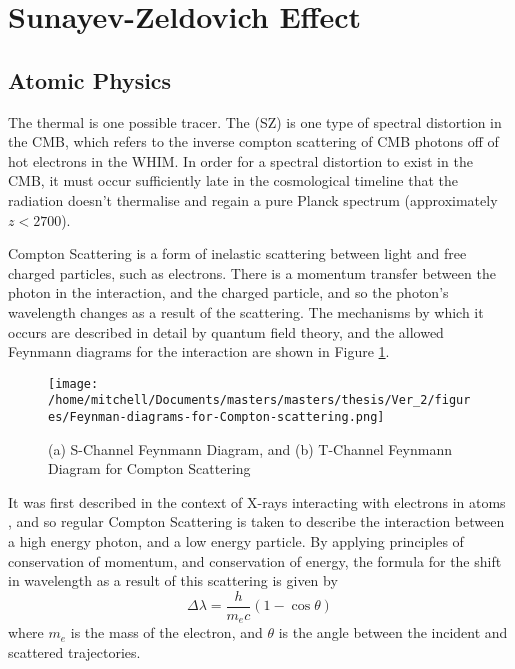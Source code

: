 \section{Sunayev-Zeldovich Effect}

\subsection{Atomic Physics}
The thermal \sze is one possible tracer. The \sze (SZ) is one type of spectral distortion in the CMB, which refers to the inverse compton scattering of CMB photons off of hot electrons in the WHIM. In order for a spectral distortion to exist in the CMB, it must occur sufficiently late in the cosmological timeline that the radiation doesn't thermalise and regain a pure Planck spectrum (approximately $z < 2700$).

Compton Scattering is a form of inelastic scattering between light and free charged particles, such as electrons. There is a momentum transfer between the photon in the interaction, and the charged particle, and so the photon's wavelength changes as a result of the scattering. The mechanisms by which it occurs are described in detail by quantum field theory, and the allowed Feynmann diagrams for the interaction are shown in Figure \ref{fig:compton_scattering}.

\begin{figure}[h!]
\centering
\texttt{[image: /home/mitchell/Documents/masters/masters/thesis/Ver\_2/figures/Feynman-diagrams-for-Compton-scattering.png]}
\label{fig:compton_scattering}
\caption{(a) S-Channel Feynmann Diagram, and (b) T-Channel Feynmann Diagram for Compton Scattering }
\label{fig:compton_scattering}
\end{figure}


It was first described in the context of X-rays interacting with electrons in atoms \citep{1923PhRv...21..483C}, and so regular Compton Scattering is taken to describe the interaction between a high energy photon, and a low energy particle. By applying principles of conservation of momentum, and conservation of energy,  the formula for the shift in wavelength as a result of this scattering is given by
\begin{equation}
	\Delta \lambda = \frac{h}{m_ec}\left(1-\cos\theta\right)
	\label{eqn:compton_shift}
\end{equation}
where $m_e$ is the mass of the electron, and $\theta$ is the angle between the incident and scattered trajectories. 


